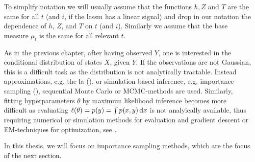 \begin{remark}
    To simplify notation we will usually assume that the functions $h, Z$ and $T$ are the same for all $t$ (and $i$, if the \gls{lcssm} has a linear signal) and drop in our notation the dependence of $h$, $Z$, and $T$ on $t$ (and $i$). Similarly we assume that the base measure $\mu_t$ is the same for all relevant $t$.
\end{remark}

As in the previous chapter, after having observed $Y$, one is interested in the conditional distribution of states $X$, given $Y$. If the observations are not Gaussian, this is a difficult task as the distribution is not analytically tractable. Instead approximations, e.g. the \gls{la} (), or simulation-based inference, e.g. importance sampling (), sequential Monte Carlo \cite{Chopin2020Introduction} or MCMC-methods \cite{Brooks2011Handbook} are used. Similarly, fitting hyperparameters $\theta$ by maximum likelihood inference becomes more difficult as evaluating $\ell(\theta) = p(y) = \int p(x,y) \,\mathrm d x$ is not analyically available, thus requiring numerical or simulation methods for evaluation and gradient descent or EM-techniques for optimization, see .

In this thesis, we will focus on importance sampling methods, which are the focus of the next section.